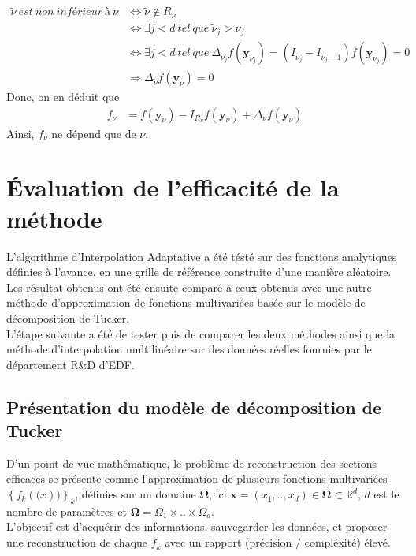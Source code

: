 \begin{align}
		\tilde{\nu}\ est\ non\ inférieur\ à\ \nu 		&	\Leftrightarrow \tilde{\nu} \notin R_{\nu} \\ \nonumber
																								&	\Leftrightarrow \exists j<d\ tel\ que\ \tilde{\nu}_j > \nu_j \\ \nonumber
																								&	\Leftrightarrow \exists j<d\ tel\ que\ \Delta_{\tilde{\nu}_j} f(\textbf{y}_{\nu_j}) = (I_{\tilde{\nu}_j} - I_{\tilde{\nu}_j-1}) f(\textbf{y}_{\nu_j}) = 0\\ \nonumber
																								&	\Rightarrow \Delta_{\tilde{\nu}} f(\textbf{y}_{\nu}) = 0 \nonumber
\end{align}
Donc, on en déduit que
\begin{align}
		f_{\nu} &= f(\textbf{y}_{\nu}) - I_{R_{\nu}}f(\textbf{y}_{\nu}) + \Delta_{\nu}f(\textbf{y}_{\nu}) \nonumber
\end{align}
Ainsi, $f_{\nu}$ ne dépend que de $\nu$.



\section{Évaluation de l'efficacité de la méthode}\label{sec:6}
\space{0.5cm} L'algorithme d'Interpolation Adaptative a été tésté sur des fonctions analytiques définies à l'avance, en une grille de référence construite d'une manière aléatoire.\\
Les résultat obtenus ont été ensuite comparé à ceux obtenus avec une autre méthode d'approximation de fonctions multivariées basée sur
le modèle de décomposition de Tucker.\\
L'étape suivante a été de tester puis de comparer les deux méthodes ainsi que la méthode d'interpolation multilinéaire sur des données réelles fournies par le département R\&D d'EDF.

\subsection{Présentation du modèle de décomposition de Tucker}
\hspace{0.5cm} D'un point de vue mathématique, le problème de reconstruction des sections efficaces se présente comme l'approximation de plusieurs fonctions multivariées $\left \{ f_k(\mathbf(x)) \right \}_k$,
définies sur un domaine $\mathbf{\Omega}$, ici $\mathbf{x} = (x_1,..,x_d) \in \mathbf{\Omega} \subset \mathbb{R}^d$, $d$ est le nombre de paramètres et $\mathbf{\Omega} = \Omega_1 \times .. \times \Omega_d$.\\
L'objectif est d'acquérir des informations, sauvegarder les données, et proposer une reconstruction de chaque $f_k$ avec un rapport (précision $/$ compléxité) élevé.
